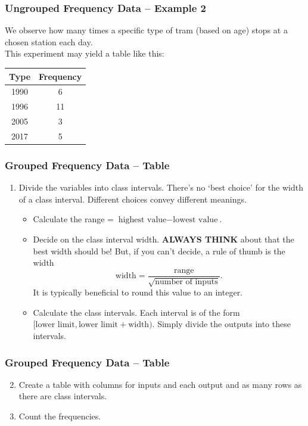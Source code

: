 \documentclass[aspectratio=169,11pt,svgnames,handout]{beamer}
\begin{document}
\begin{frame}
 \frametitle{Ungrouped Frequency Data -- Example 2}
 We observe how many times a specific type of tram (based on age) stops at a
 chosen station each day.\\
 \pause
 This experiment may yield a table like this:
 \begin{center}
  \begin{tabular}{c|c}
   \textbf{Type} & \textbf{Frequency}\\
   \toprule
   1990 & 6\\
   1996 & 11\\
   2005 & 3\\
   2017 & 5
  \end{tabular}
 \end{center}
\end{frame}

\begin{frame}
 \frametitle{Grouped Frequency Data -- Table}
 \begin{enumerate}
  \item Divide the variables into \alert{class intervals}. There's no `best
   choice' for the width of a class interval. Different choices convey different
   meanings.
   \pause
   \begin{itemize}
    \item Calculate the \alert{range} = $\text{highest value} - \text{lowest
     value}$.
    \pause
    \item Decide on the \alert{class interval width}. \textbf{ALWAYS THINK}
     about that the best width should be! But, if you can't decide, a rule of
     thumb is the width
     \[
      \text{width} = \frac{\text{range}}{\sqrt{\text{number of inputs}}}.
     \]
     It is typically beneficial to round this value to an integer.
    \pause
    \item Calculate the \alert{class intervals}. Each interval is of the form
     $[\text{lower limit}, \text{lower limit} + \text{width})$. Simply divide
     the outputs into these intervals.
   \end{itemize}
 \end{enumerate}
\end{frame}

\begin{frame}
 \frametitle{Grouped Frequency Data -- Table}
 \begin{enumerate}
  \setcounter{enumi}{1}
  \item Create a \alert{table} with columns for inputs and each output and as
   many rows as there are class intervals.
  \pause
  \item Count the \alert{frequencies}.
 \end{enumerate}
\end{frame}
\end{document}
